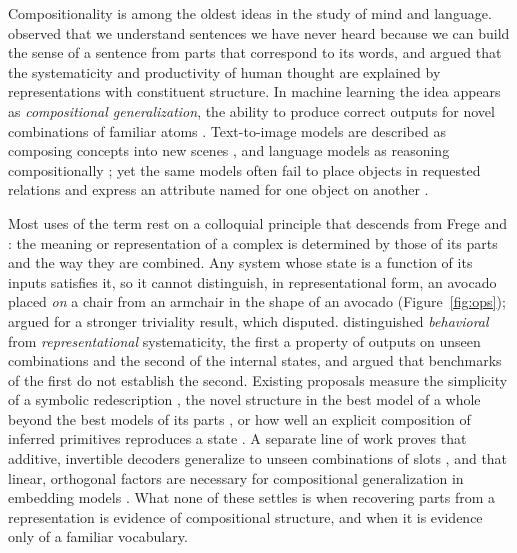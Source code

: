 \documentclass[10pt]{article}
\theoremstyle{plain}
\theoremstyle{remark}
\begin{document}
Compositionality is among the oldest ideas in the study of mind and language. \citet{frege1923} observed that we understand sentences we have never heard because we can build the sense of a sentence from parts that correspond to its words, and \citet{fodor1988} argued that the systematicity and productivity of human thought are explained by representations with constituent structure. In machine learning the idea appears as \emph{compositional generalization}, the ability to produce correct outputs for novel combinations of familiar atoms \citep{lake2018,keysers2020,kim2020cogs}. Text-to-image models are described as composing concepts into new scenes \citep{ramesh2021,okawa2023}, and language models as reasoning compositionally \citep{press2023}; yet the same models often fail to place objects in requested relations \citep{conwell2022} and express an attribute named for one object on another \citep{rassin2022}.

Most uses of the term rest on a colloquial principle that descends from Frege and \citet{montague1970}: the meaning or representation of a complex is determined by those of its parts and the way they are combined. Any system whose state is a function of its inputs satisfies it, so it cannot distinguish, in representational form, an avocado placed \emph{on} a chair from an armchair in the shape of an avocado (Figure~\ref{fig:ops}); \citet{zadrozny1994} argued for a stronger triviality result, which \citet{westerstahl1998} disputed. \citet{vegner2025} distinguished \emph{behavioral} from \emph{representational} systematicity, the first a property of outputs on unseen combinations and the second of the internal states, and argued that benchmarks of the first do not establish the second. Existing proposals measure the simplicity of a symbolic redescription \citep{elmoznino2024}, the novel structure in the best model of a whole beyond the best models of its parts \citep{elmoznino2026}, or how well an explicit composition of inferred primitives reproduces a state \citep{andreas2019}. A separate line of work proves that additive, invertible decoders generalize to unseen combinations of slots \citep{lachapelle2023,wiedemer2024}, and that linear, orthogonal factors are necessary for compositional generalization in embedding models \citep{uselis2026}. What none of these settles is when recovering parts from a representation is evidence of compositional structure, and when it is evidence only of a familiar vocabulary.
\end{document}
